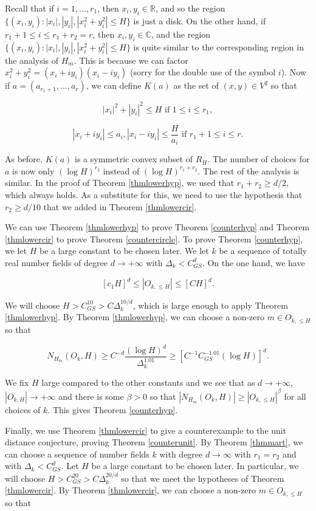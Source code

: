 \documentclass{amsart}
\newcommand{\CC}{\mathbb{C}}
\newcommand{\RR}{\mathbb{R}}
\begin{document}
Recall that if $i=1, ..., r_1$, then $x_i, y_i \in \RR$, and so the region $ \{(x_i, y_i):   |x_i|, |y_i|, |x_i^2 + y_i^2 | \le H \}$ is just a disk.  On the other hand, if $r_1 + 1 \le i \le r_1 + r_2 = r$, then $x_i, y_i \in \CC$, and the region $ \{(x_i, y_i):   |x_i|, |y_i|, |x_i^2 + y_i^2 | \le H \}$ is quite similar to the corresponding region in the analysis of $H_m$.  This is because we can factor $x_i^2 + y_i^2 = (x_i + i y_i) (x_i - i y_i)$ (sorry for the double use of the symbol $i$).  Now if $a = (a_{r_1 + 1}, ..., a_r)$, we can define $K(a)$ as the set of $(x,y) \in V^2$ so that

$$ |x_i|^2 + |y_i|^2 \le H \textrm{ if } 1 \le i \le r_1, $$

$$ | x_i + i y_i| \le a_i, |x_i - i y_i| \le \frac{H}{a_i} \textrm{ if } r_1 + 1 \le i \le r. $$

As before, $K(a) $ is a symmetric convex subset of $R_H$.  The number of choices for $a$ is now only $(\log H)^{r_2}$ instead of $(\log H)^{r_1 + r_2}$.  The rest of the analysis is similar.  In the proof of Theorem \ref{thmlowerhyp}, we used that $r_1 + r_2 \ge d/2$, which always holds.  As a substitute for this, we need to use the hypothesis that $r_2 \ge d/10$ that we added in Theorem \ref{thmlowercir}.  

We can use Theorem \ref{thmlowerhyp} to prove Theorem \ref{counterhyp} and Theorem \ref{thmlowercir} to prove Theorem \ref{countercircle}.   To prove Theorem \ref{counterhyp},  we let $H$ be a large constant to be chosen later.   We let $k$ be a sequence of totally real number fields of degree $d \rightarrow + \infty$ with $\Delta_k < C_{GS}^d$.   On the one hand, we have

$$[c_1 H]^d \le |O_{k, \le H} | \le \left[ C H \right]^d . $$

\noindent We will choose $H >  C_{GS}^{10} > C \Delta_k^{10/d}$, which is large enough to apply Theorem \ref{thmlowerhyp}.  By Theorem \ref{thmlowerhyp},  we can choose a non-zero $m \in O_{k, \le H}$ so that 

$$N_{H_m}(O_k, H) \ge C^{-d} \frac{ (\log H)^d}{\Delta_k^{1.01}} \ge \left[ C^{-1} C_{GS}^{-1.01} (\log H) \right]^d. $$

\noindent    We fix $H$ large compared to the other constants and we see that as $d \rightarrow + \infty$, $|O_{k,H}| \rightarrow + \infty$ and there is some $\beta > 0$ so that $|N_{H_m}(O_k, H)| \ge |O_{k, \le H}|^\beta$ for all choices of $k$.  This gives Theorem \ref{counterhyp}.

Finally,  we use Theorem \ref{thmlowercir} to give a counterexample to the unit distance conjecture, proving Theorem \ref{counterunit}.   By Theorem \ref{thmmart},  we can choose a sequence of number fields $k$ with degree $d \rightarrow \infty$ with $r_1 = r_2$ and with  $\Delta_k < C_{GS}^d$.   Let $H$ be a large constant to be chosen later.   In particular, we will choose $H > C_{GS}^{20} > C \Delta_k^{20/d}$ so that we meet the hypotheses of Theorem \ref{thmlowercir}.  By Theorem \ref{thmlowercir}, we can choose a non-zero $m \in O_{k, \le H}$ so that 
\end{document}
